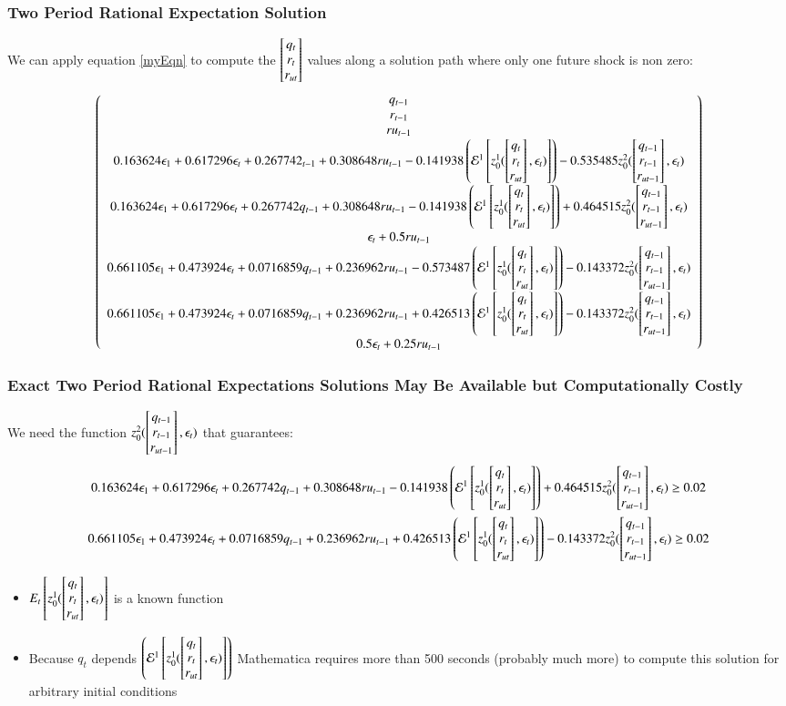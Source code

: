 \documentclass{beamer}
\begin{document}
    \begin{frame}
      \frametitle{Two Period Rational Expectation Solution}
We can apply equation \ref{myEqn} to compute the $\begin{bmatrix} q_t\\r_{t}\\r_{ut} \end{bmatrix}$ values along a solution path where only one future shock is non zero:
{\tiny
      \begin{gather*}
           \left(
   \begin{array}{c}
    q_{t-1} \\
    r_{t-1} \\
    ru_{t-1} \\
  0.163624 \epsilon_{1}+0.617296 \epsilon_t+0.267742 _{t-1}+0.308648 ru_{t-1}-0.141938
      \left ( \mathcal{E}^{1} \left [z_0^1(\begin{bmatrix} q_t\\r_{t}\\r_{ut} \end{bmatrix},\epsilon_t) \right ]\right )-0.535485 z_0^2(\begin{bmatrix} q_{t-1}\\r_{t-1}\\r_{ut-1} \end{bmatrix},\epsilon_t) \\
    0.163624 \epsilon_{1}+0.617296 \epsilon_t+0.267742 q_{t-1}+0.308648 ru_{t-1}-0.141938
       \left ( \mathcal{E}^{1} \left [z_0^1(\begin{bmatrix} q_t\\r_{t}\\r_{ut} \end{bmatrix},\epsilon_t) \right ]\right )+0.464515 z_0^2(\begin{bmatrix} q_{t-1}\\r_{t-1}\\r_{ut-1} \end{bmatrix},\epsilon_t) \\
    \epsilon_t+0.5 ru_{t-1} \\
    0.661105 \epsilon_{1}+0.473924 \epsilon_t+0.0716859 q_{t-1}+0.236962 ru_{t-1}-0.573487
       \left ( \mathcal{E}^{1} \left [z_0^1(\begin{bmatrix} q_t\\r_{t}\\r_{ut} \end{bmatrix},\epsilon_t) \right ]\right ) -0.143372 z_0^2(\begin{bmatrix} q_{t-1}\\r_{t-1}\\r_{ut-1} \end{bmatrix},\epsilon_t) \\
   0.661105 \epsilon_{1}+ 0.473924 \epsilon_t+0.0716859 q_{t-1}+0.236962 ru_{t-1}+0.426513
       \left ( \mathcal{E}^{1} \left [z_0^1(\begin{bmatrix} q_t\\r_{t}\\r_{ut} \end{bmatrix},\epsilon_t) \right ]\right ) -0.143372 z_0^2(\begin{bmatrix} q_{t-1}\\r_{t-1}\\r_{ut-1} \end{bmatrix},\epsilon_t) \\
    0.5 \epsilon_t+0.25 ru_{t-1} 
   \end{array}
   \right)
      \end{gather*}
}

    \end{frame}

    \begin{frame}
\frametitle{Exact Two Period Rational Expectations Solutions May Be Available but Computationally Costly}

We need the function {\small $z_0^2(\begin{bmatrix} q_{t-1}\\r_{t-1}\\r_{ut-1} \end{bmatrix},\epsilon_t)$ }that guarantees:
{\tiny 
\begin{gather*}
 0.163624 \epsilon_{1}+  0.617296 \epsilon_t+0.267742 q_{t-1}+0.308648 ru_{t-1}-0.141938
       \left ( \mathcal{E}^{1} \left [z_0^1(\begin{bmatrix} q_t\\r_{t}\\r_{ut} \end{bmatrix},\epsilon_t) \right ]\right )+0.464515 z_0^2(\begin{bmatrix} q_{t-1}\\r_{t-1}\\r_{ut-1} \end{bmatrix},\epsilon_t) \ge 0.02\\  
    0.661105 \epsilon_{1}+    0.473924 \epsilon_t+0.0716859 q_{t-1}+0.236962 ru_{t-1}+0.426513
       \left ( \mathcal{E}^{1} \left [z_0^1(\begin{bmatrix} q_t\\r_{t}\\r_{ut} \end{bmatrix},\epsilon_t) \right ]\right )-0.143372 z_0^2(\begin{bmatrix} q_{t-1}\\r_{t-1}\\r_{ut-1} \end{bmatrix},\epsilon_t)  \ge 0.02 \\
\end{gather*}
}
\begin{itemize}
\item {\small $E_{t} \left [z_0^1(\begin{bmatrix} q_t\\r_{t}\\r_{ut} \end{bmatrix},\epsilon_t) \right ]$ } is a known function
\item Because $q_t$ depends {\small $ \left ( \mathcal{E}^{1} \left [z_0^1(\begin{bmatrix} q_t\\r_{t}\\r_{ut} \end{bmatrix},\epsilon_t) \right ]\right ) $ } Mathematica requires more than 500 seconds (probably much more) to compute this solution for arbitrary initial conditions
\end{itemize}
    \end{frame}
    
\end{document}
